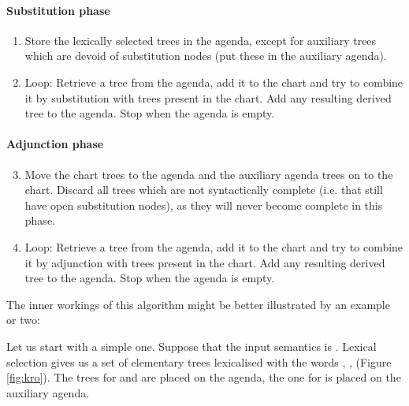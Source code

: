 \paragraph{Substitution phase}
\begin{enumerate}
\item Store the lexically selected trees in
  the agenda, except for auxiliary trees which are devoid of
  substitution nodes (put these in the auxiliary agenda).\\
\item Loop: Retrieve a tree from the agenda, add it to the chart and try
  to combine it by substitution with trees present in the chart. Add any
  resulting derived tree to the agenda. Stop when the agenda is empty.
\end{enumerate}

\paragraph{Adjunction phase}
\begin{enumerate}
\setcounter{enumi}{2}
\item Move the chart trees to the agenda and the auxiliary agenda trees
      on to the chart.  Discard all trees which are not syntactically
      complete (i.e. that still have open substitution nodes), as they
      will never become complete in this phase.
\item Loop: Retrieve a tree from the agenda, add it to the chart and try to
  combine it by adjunction with trees present in the chart. Add any
  resulting derived tree to the agenda. Stop when the agenda is empty.
\end{enumerate}

\noindent
The inner workings of this algorithm might be better illustrated by an
example or two:


Let us start with a simple one. Suppose that the input semantics is
.
Lexical selection gives us a set of elementary
trees lexicalised with the words ,
,  (Figure \ref{fig:kro}).  The
trees for  and  are placed on
the agenda, the one for  is placed on the auxiliary
agenda.

